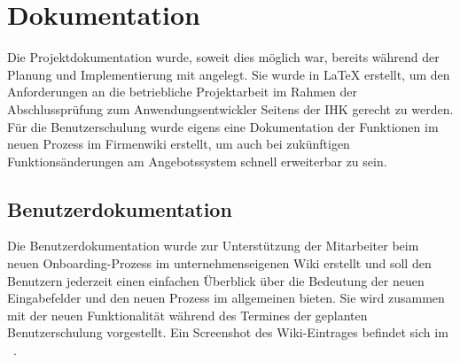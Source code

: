\section{Dokumentation}
\label{sec:Dokumentation}
Die Projektdokumentation wurde, soweit dies möglich war, bereits während der Planung und Implementierung mit angelegt. Sie wurde in \LaTeX{ } erstellt, um den Anforderungen an die betriebliche Projektarbeit im Rahmen der Abschlussprüfung zum Anwendungsentwickler Seitens der \ac{IHK} gerecht zu werden. Für die Benutzerschulung wurde eigens eine Dokumentation der Funktionen im neuen Prozess im Firmenwiki erstellt, um auch bei zukünftigen Funktionsänderungen am Angebotssystem schnell erweiterbar zu sein.


\subsection{Benutzerdokumentation}
\label{subsec:Benutzerdokumentation}

Die Benutzerdokumentation wurde zur Unterstützung der Mitarbeiter beim neuen Onboarding-Prozess im unternehmenseigenen Wiki erstellt und soll den Benutzern jederzeit einen einfachen Überblick über die Bedeutung der neuen Eingabefelder und den neuen Prozess im allgemeinen bieten. Sie wird zusammen mit der neuen Funktionalität während des Termines der geplanten Benutzerschulung vorgestellt. Ein Screenshot des Wiki-Eintrages befindet sich im ~.

